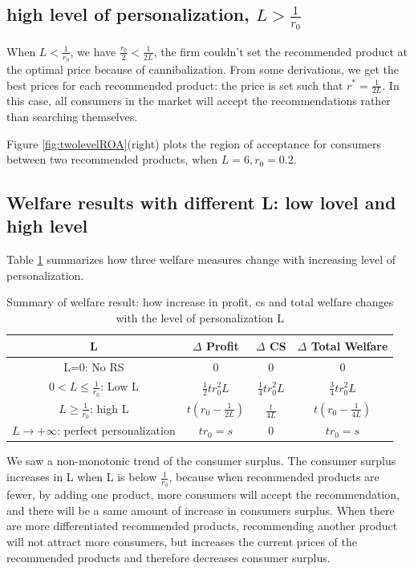 \documentclass[11pt, oneside]{article}   	%
\begin{document}
\subsection{high level of personalization, $L > \frac{1}{r_0}$}
When $L <\frac{1}{r_0}$, we have $\frac{r_0}{2} <\frac{1}{2L}$, the firm couldn't set the recommended product at the optimal price because of cannibalization. From some derivations, we get the best prices for each recommended product: the price is set such that $r^* = \frac{1}{2L}$. In this case, all consumers in the market will accept the recommendations rather than searching themselves.

Figure \ref{fig:twolevelROA}(right) plots the region of acceptance for consumers between two recommended products, when $L = 6, r_0 = 0.2$.
\subsection{Welfare results with different L: low lovel and high level}
Table \ref{tab:comp3welfare} summarizes how three welfare measures change with increasing level of personalization. 
\begin{table}[h]
\begin{tabular}[h]{|c|c|c|c|}
\hline 
L &  $\Delta$ Profit  & $\Delta$ CS & $\Delta$ Total Welfare \\
\hline \hline
L=0: No RS & 0 & 0&0\\
\hline
$0<L\leq \frac{1}{r_0} $: Low L & $\frac{1}{2} tr_0^2L$ & $\frac{1}{4}tr_0^2L$&$\frac{3}{4}tr_0^2L$\\
\hline
$L \geq \frac{1}{r_0}$: high L & $t(r_0 -\frac{1}{2L})$ & $\frac{t}{4L}$&$t(r_0 - \frac{1}{4L})$ \\
\hline
$L\to +\infty$: perfect personalization&$tr_0=s$&0&$tr_0=s$\\
\hline
\end{tabular}
\caption{Summary of welfare result: how increase in profit, cs and total welfare changes with the level of personalization L}
\label{tab:comp3welfare}
\end{table}
We saw a non-monotonic trend of the consumer surplus. The consumer surplus increases in L when L is below $\frac{1}{r_0}$, because when recommended products are fewer, by adding one product, more consumers will accept the recommendation, and there will be a same amount of increase in consumers surplus. When there are more differentiated recommended products, recommending another product will not attract more consumers, but increases the current prices of the recommended products and therefore decreases consumer surplus. 
\end{document}
